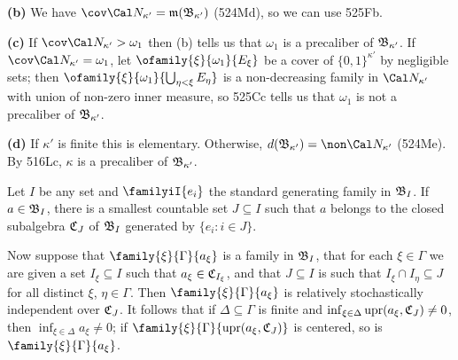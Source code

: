 {\medskip

{\bf (b)} We have $\cov\Cal N_{\kappa'}=\frak m(\frak B_{\kappa'})$
(524Md), so we can use 525Fb.

\medskip

{\bf (c)} If $\cov\Cal N_{\kappa'}>\omega_1$ then (b) tells us that
$\omega_1$ is a precaliber of $\frak B_{\kappa'}$.   If
$\cov\Cal N_{\kappa'}=\omega_1$, let $\ofamily{\xi}{\omega_1}{E_{\xi}}$
be a cover of $\{0,1\}^{\kappa'}$ by negligible sets;  then
$\ofamily{\xi}{\omega_1}{\bigcup_{\eta<\xi}E_{\eta}}$ is a
non-decreasing
family in $\Cal N_{\kappa'}$ with union of non-zero inner measure, so
525Cc tells us that $\omega_1$ is not a precaliber of
$\frak B_{\kappa'}$.

\medskip

{\bf (d)} If $\kappa'$ is finite this is elementary.   Otherwise,
$d(\frak B_{\kappa'})=\non\Cal N_{\kappa'}$ (524Me).   By 516Lc,
$\kappa$ is a precaliber of $\frak B_{\kappa'}$.
}%

   Let $I$ be any
set and $\familyiI{e_i}$ the standard generating family in $\frak B_I$.
If $a\in\frak B_I$,
there is a smallest countable set $J\subseteq I$ such that $a$ belongs
to the closed subalgebra $\frak C_J$ of $\frak B_I$ generated by
$\{e_i:i\in J\}$.   

Now suppose that $\family{\xi}{\Gamma}{a_{\xi}}$ is a family in
$\frak B_I$, that for each $\xi\in\Gamma$ we are given a set
$I_{\xi}\subseteq I$ such that $a_{\xi}\in\frak C_{I_{\xi}}$, and that
$J\subseteq I$ is such that $I_{\xi}\cap I_{\eta}\subseteq J$ for all
distinct $\xi$, $\eta\in\Gamma$.   Then $\family{\xi}{\Gamma}{a_{\xi}}$
is relatively stochastically independent over
$\frak C_J$.   
It follows that if $\Delta\subseteq\Gamma$ is finite and
$\inf_{\xi\in\Delta}\mathop{\text{upr}}(a_{\xi},\frak C_J)\ne 0$, then
$\inf_{\xi\in\Delta}a_{\xi}\ne 0$;
\cmmnt{in particular,} if
$\family{\xi}{\Gamma}{\upr(a_{\xi},\frak C_J)}$ is centered, so is
$\family{\xi}{\Gamma}{a_{\xi}}$.

